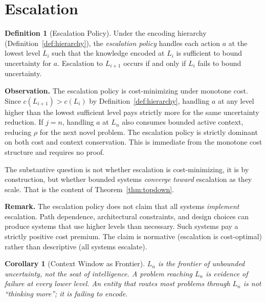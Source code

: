 \documentclass[11pt]{article}
\newtheorem{corollary}[theorem]{Corollary}
\theoremstyle{definition}
\newtheorem{definition}{Definition}
\begin{document}
\section{Escalation}
\label{sec:escalation}

\begin{definition}[Escalation Policy]
\label{def:escalation}
Under the encoding hierarchy (Definition~\ref{def:hierarchy}), the
\emph{escalation policy} handles each action $a$ at the lowest level
$L_i$ such that the knowledge encoded at $L_i$ is sufficient to bound
uncertainty for $a$. Escalation to $L_{i+1}$ occurs if and only if
$L_i$ fails to bound uncertainty.
\end{definition}

\textbf{Observation.} The escalation policy is cost-minimizing under
monotone cost. Since $c(L_{i+1}) > c(L_i)$ by
Definition~\ref{def:hierarchy}, handling $a$ at any level higher than
the lowest sufficient level pays strictly more for the same uncertainty
reduction. If $j = n$, handling $a$ at $L_n$ also consumes bounded
active context, reducing $\rho$ for the next novel problem. The
escalation policy is strictly dominant on both cost and context
conservation. This is immediate from the monotone cost structure and
requires no proof.

The substantive question is not whether escalation is cost-minimizing,
it is by construction, but whether bounded systems \emph{converge
toward} escalation as they scale. That is the content of
Theorem~\ref{thm:topdown}.

\textbf{Remark.} The escalation policy does not claim that all systems
\emph{implement} escalation. Path dependence, architectural
constraints, and design choices can produce systems that use higher
levels than necessary. Such systems pay a strictly positive cost
premium. The claim is normative (escalation is cost-optimal) rather
than descriptive (all systems escalate).

\begin{corollary}[Context Window as Frontier]
\label{cor:frontier}
$L_n$ is the frontier of unbounded uncertainty, not the seat of
intelligence. A problem reaching $L_n$ is evidence of failure at every
lower level. An entity that routes most problems through $L_n$ is not
``thinking more''; it is failing to encode.
\end{corollary}
\end{document}
